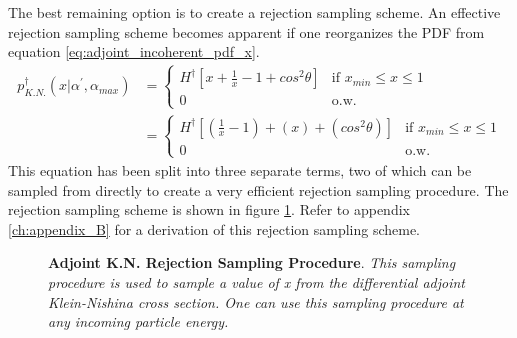 The best remaining option is to create a rejection sampling scheme. An 
effective rejection sampling scheme becomes apparent if one reorganizes the
PDF from equation \ref{eq:adjoint_incoherent_pdf_x}.
\begin{align}
  p_{K.N.}^{\dagger}(x|\alpha^{'},\alpha_{max}) & = 
  \begin{cases}
    H^{\dagger}\left[x + \frac{1}{x} - 1 + cos^2\theta \right] 
    & \text{if } x_{min} \leq x \leq 1 \\
    0 & \text{o.w.}
  \end{cases} \nonumber \\
  & = 
  \begin{cases}
    H^{\dagger}\left[\left(\frac{1}{x} - 1 \right) + \left(x\right) + 
      \left(cos^2\theta\right) \right] 
    & \text{if } x_{min} \leq x \leq 1 \\
    0 & \text{o.w.}
  \end{cases} \label{eq:reorganized_adjoint_KN_pdf}
\end{align}
This equation has been split into three separate terms, two of which can be 
sampled from directly to create a very efficient rejection sampling procedure.
The rejection sampling scheme is shown in figure 
\ref{fig:adjoint_KN_rejection_sampling}. Refer to appendix \ref{ch:appendix_B}
for a derivation of this rejection sampling scheme.
\begin{figure}[t!]
  \begin{center}
    \def\svgwidth{360bp}
    
  \end{center}
  \caption{\textbf{Adjoint K.N. Rejection Sampling Procedure}.
    \textit{This sampling procedure is used to sample a value of x from the
    differential adjoint Klein-Nishina cross section. One can use this sampling
    procedure at any incoming particle energy.}}
  \label{fig:adjoint_KN_rejection_sampling}
\end{figure}

